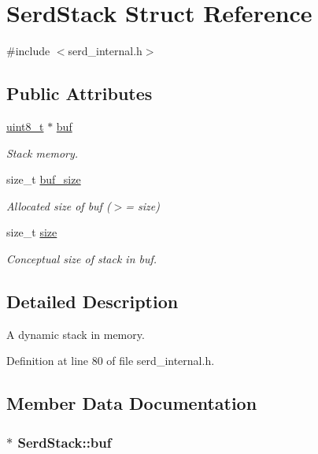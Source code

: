 \hypertarget{struct_serd_stack}{}\section{Serd\+Stack Struct Reference}
\label{struct_serd_stack}


{\ttfamily \#include $<$serd\+\_\+internal.\+h$>$}

\subsection*{Public Attributes}
\begin{DoxyCompactItemize}
\item 
\hyperlink{lib-src_2ffmpeg_2win32_2stdint_8h_a9a941819355e6f658991890ff66b4b0e}{uint8\+\_\+t} $\ast$ \hyperlink{struct_serd_stack_afdbaaf0b33676c624273fea6c6715b71}{buf}
\begin{DoxyCompactList}\small\item\em Stack memory. \end{DoxyCompactList}\item 
size\+\_\+t \hyperlink{struct_serd_stack_ae60a132820792258504633e72535bf94}{buf\+\_\+size}
\begin{DoxyCompactList}\small\item\em Allocated size of buf ($>$= size) \end{DoxyCompactList}\item 
size\+\_\+t \hyperlink{struct_serd_stack_a2fda2753d2ada98036894458c573bf38}{size}
\begin{DoxyCompactList}\small\item\em Conceptual size of stack in buf. \end{DoxyCompactList}\end{DoxyCompactItemize}


\subsection{Detailed Description}
A dynamic stack in memory. 

Definition at line 80 of file serd\+\_\+internal.\+h.



\subsection{Member Data Documentation}
\subsubsection[{\texorpdfstring{buf}{buf}}]{$\ast$ Serd\+Stack\+::buf}\hypertarget{struct_serd_stack_afdbaaf0b33676c624273fea6c6715b71}{}\label{struct_serd_stack_afdbaaf0b33676c624273fea6c6715b71}


